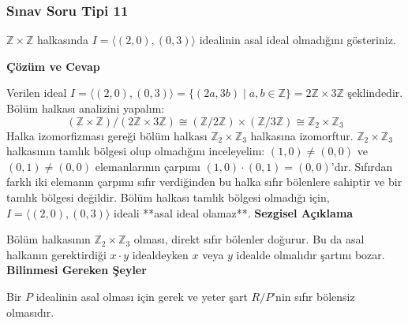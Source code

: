 \documentclass[11pt, a4paper]{article}
\newenvironment{cozum}{
    \vspace{0.5cm}
    \noindent\textcolor{green!60!black}{\faCheckCircle\enspace \textbf{\Large Çözüm ve Cevap}}\par\vspace{0.2cm}
}{}
\newenvironment{sezgisel}{
    \vspace{0.5cm}
    \noindent\textcolor{orange!80!black}{\faLightbulb\enspace \textbf{\Large Sezgisel Açıklama}}\par\vspace{0.2cm}
    \itshape
}{}
\newenvironment{bilgi}{
    \vspace{0.5cm}
    \noindent\textcolor{red!70!black}{\faExclamationTriangle\enspace \textbf{\Large Bilinmesi Gereken Şeyler}}\par\vspace{0.2cm}
}{}
\begin{document}
\subsubsection{Sınav Soru Tipi 11}
\begin{sinavbox}
$\mathbb{Z} \times \mathbb{Z}$ halkasında $I = \langle (2, 0), (0, 3) \rangle$ idealinin asal ideal olmadığını gösteriniz.
\end{sinavbox}
\begin{cozum}
Verilen ideal $I = \langle (2, 0), (0, 3) \rangle = \{ (2a, 3b) \mid a, b \in \mathbb{Z} \} = 2\mathbb{Z} \times 3\mathbb{Z}$ şeklindedir.
Bölüm halkası analizini yapalım:
\[ (\mathbb{Z} \times \mathbb{Z}) / (2\mathbb{Z} \times 3\mathbb{Z}) \cong (\mathbb{Z}/2\mathbb{Z}) \times (\mathbb{Z}/3\mathbb{Z}) \cong \mathbb{Z}_2 \times \mathbb{Z}_3 \]
Halka izomorfizması gereği bölüm halkası $\mathbb{Z}_2 \times \mathbb{Z}_3$ halkasına izomorftur.
$\mathbb{Z}_2 \times \mathbb{Z}_3$ halkasının tamlık bölgesi olup olmadığını inceleyelim:
$(1, 0) \neq (0, 0)$ ve $(0, 1) \neq (0, 0)$ elemanlarının çarpımı $(1, 0) \cdot (0, 1) = (0, 0)$'dır.
Sıfırdan farklı iki elemanın çarpımı sıfır verdiğinden bu halka sıfır bölenlere sahiptir ve bir tamlık bölgesi değildir.
Bölüm halkası tamlık bölgesi olmadığı için, $I = \langle (2, 0), (0, 3) \rangle$ ideali **asal ideal olamaz**.
\end{cozum}
\begin{sezgisel}
Bölüm halkasının $\mathbb{Z}_2 \times \mathbb{Z}_3$ olması, direkt sıfır bölenler doğurur. Bu da asal halkanın gerektirdiği $x \cdot y$ idealdeyken $x$ veya $y$ idealde olmalıdır şartını bozar.
\end{sezgisel}
\begin{bilgi}
Bir $P$ idealinin asal olması için gerek ve yeter şart $R/P$'nin sıfır bölensiz olmasıdır.
\end{bilgi}

\newpage
\end{document}
